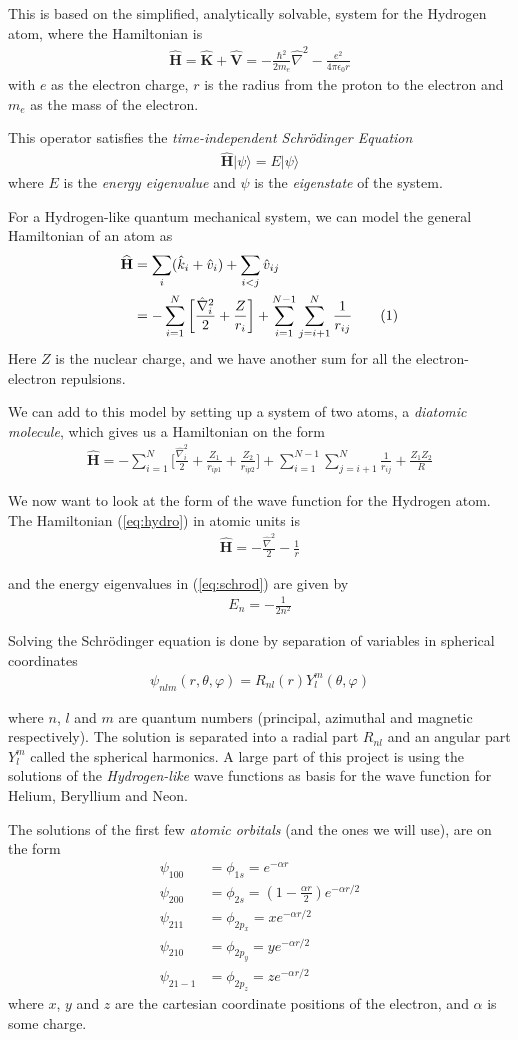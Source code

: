\documentclass[twocolumns, a4paper,10pt,fleqn]{extarticle}
\newcommand{\eq}[1]{{\small\begin{align*}#1\end{align*}}}
\newcommand{\equ}[1]{{\small\begin{align}#1\end{align}}}
\newcommand{\ket}[1]{|#1\rangle}
\newcommand\numberthis{\addtocounter{equation}{1}\tag{\theequation}}
\newcommand{\OP}[1]{\mathbf{\widehat{#1}}}
\newcommand{\op}[1]{\hat{#1}}
\begin{document}
This is based on the simplified, analytically solvable, system for the 
Hydrogen atom, where the Hamiltonian is
\equ{
  \OP H = \OP K + \OP V = -\frac{\hbar^2}{2m_e}\op \nabla^2 
  - \frac{e^2}{4\pi \epsilon_0 r} \label{eq:hydro}
}
with $e$ as the electron charge, $r$ is the radius from the proton to the electron
and $m_e$ as the mass of the electron.

This operator satisfies the \textit{time-independent Schr\"odinger Equation}
\equ{
  \OP H \ket{\psi} = E \ket{\psi}\label{eq:schrod}
}
where $E$ is the \textit{energy eigenvalue} and $\psi$ is the \textit{eigenstate} of the system.

For a Hydrogen-like quantum mechanical system, we can model the general
Hamiltonian of an atom as
\eq{
  \OP H
  &=\sum_i (\op k_i + \op v_i)  + \sum_{i<j} \op v_{ij}\\
  &= -\sum_{i=1}^N\bigg[
    \frac{\op\nabla_i^2}{2} + \frac{Z}{r_i}\bigg] 
  + \sum_{i=1}^{N-1}\sum_{j=i+1}^N\frac{1}{r_{ij}} \numberthis\label{ham}
}
Here $Z$ is the nuclear charge, 
and we have another sum for all the electron-electron repulsions.

We can add to this model by setting up a system of two atoms,
a \textit{diatomic molecule}, which gives us a Hamiltonian on the form
\eq{
  \OP H = -\sum_{i=1}^N\bigg[
    \frac{\op\nabla_i^2}{2} + \frac{Z_1}{r_{ip1}} + \frac{Z_2}{r_{ip2}}\bigg] 
    + \sum_{i=1}^{N-1}\sum_{j=i+1}^N\frac{1}{r_{ij}} + \frac{Z_1 Z_2}{R}
}

We now want to look at the form of the wave function for the Hydrogen atom.
The Hamiltonian (\ref{eq:hydro}) in atomic units is
\eq{
  \OP H = -\frac{\op \nabla^2}{2}- \frac{1}{r}
}

and the energy eigenvalues in (\ref{eq:schrod}) are given by
\eq{
  E_n = -\frac{1}{2n^2}
}

Solving the Schr\"odinger equation is done by separation of variables in
spherical coordinates
\equ{
  \psi_{nlm}(r,\theta,\varphi) = R_{nl}(r) Y_l^{m}(\theta,\varphi)\label{eq:psi}
}

where $n$, $l$ and $m$ are quantum numbers 
(principal, azimuthal and magnetic respectively).
The solution is separated into a radial part $R_{nl}$ and an angular part $Y_l^{m}$
called the spherical harmonics.
A large part of this project is using the solutions of the \textit{Hydrogen-like}
wave functions as basis for the wave function for Helium, Beryllium and Neon.

The solutions of the first few \textit{atomic orbitals} (and the ones we will use), 
are on the form
\eq{
  \psi_{100} &= \phi_{1s} =  e^{-\alpha r}\\
  \psi_{200} &= \phi_{2s} =  \left(1-\frac{\alpha r}{2}\right)e^{-\alpha r/2} \\
  \psi_{211} &= \phi_{2p_x} = x e^{-\alpha r/2}\\
  \psi_{210} &= \phi_{2p_y} = y e^{-\alpha r/2}\\
  \psi_{21-1}&= \phi_{2p_z} = z e^{-\alpha r/2}
}
where $x$, $y$ and $z$ are the cartesian coordinate positions of the electron,
and $\alpha$ is some charge.
\end{document}
